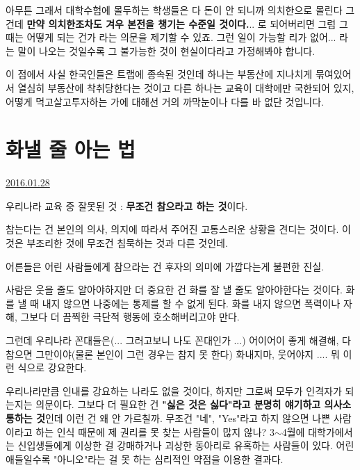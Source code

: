 아무튼 그래서 대학수험에 몰두하는 학생들은 다 돈이 안 되니까 의치한으로 몰린다 그건데
\textbf{만약 의치한조차도 겨우 본전을 챙기는 수준일 것이다.}.. 로 되어버리면 그럼 그 때는 어떻게 되는 건가 라는 의문을 제기할 수 있죠.
그런 일이 가능할 리가 없어... 라는 말이 나오는 것일수록 그 불가능한 것이 현실이다라고 가정해봐야 합니다.
\vspace{5mm}

이 점에서 사실 한국인들은 트랩에 종속된 것인데
하나는 부동산에 지나치게 묶여있어서 열심히 부동산에 착취당한다는 것이고
다른 하나는 교육이 대학에만 국한되어 있지, 어떻게 먹고살고투자하는 가에 대해선 거의 까막눈이나 다를 바 없단 것입니다.










\section{화낼 줄 아는 법}
\href{https://www.kockoc.com/Apoc/612402}{2016.01.28}

\vspace{5mm}

우리나라 교육 중 잘못된 것 : \textbf{무조건 참으라고 하는 것}이다.
\vspace{5mm}

참는다는 건 본인의 의사, 의지에 따라서 주어진 고통스러운 상황을 견디는 것이다.
이것은 부조리한 것에 무조건 침묵하는 것과 다른 것인데.
\vspace{5mm}

어른들은 어린 사람들에게 참으라는 건 후자의 의미에 가깝다는게 불편한 진실.
\vspace{5mm}

사람은 웃을 줄도 알아야하지만 더 중요한 건 화를 잘 낼 줄도 알아야한다는 것이다.
화를 낼 때 내지 않으면 나중에는 통제를 할 수 없게 된다.
화를 내지 않으면 폭력이나 자해, 그보다 더 끔찍한 극단적 행동에 호소해버리고야 만다.
\vspace{5mm}

그런데 우리나라 꼰대들은(... 그러고보니 나도 꼰대인가 ...)
어이어이 좋게 해결해, 다 참으면 그만이야(물론 본인이 그런 경우는 참지 못 한다)
화내지마, 웃어야지 .... 뭐 이런 식으로 강요한다.
\vspace{5mm}

우리나라만큼 인내를 강요하는 나라도 없을 것이다, 하지만 그로써 모두가 인격자가 되는지는 의문이다.
그보다 더 필요한 건 \textbf{"싫은 것은 싫다"라고 분명히 얘기하고 의사소통하는 것}인데 이런 건 왜 안 가르칠까.
무조건 "네", "Yes"라고 하지 않으면 나쁜 사람이라고 하는 인식 때문에 제 권리를 못 찾는 사람들이 많지 않나?
3$\sim$4월에 대학가에서는 신입생들에게 이상한 걸 강매하거나 괴상한 동아리로 유혹하는 사람들이 있다.
어린 애들일수록 "아니오"라는 걸 못 하는 심리적인 약점을 이용한 결과다.
\vspace{5mm}

